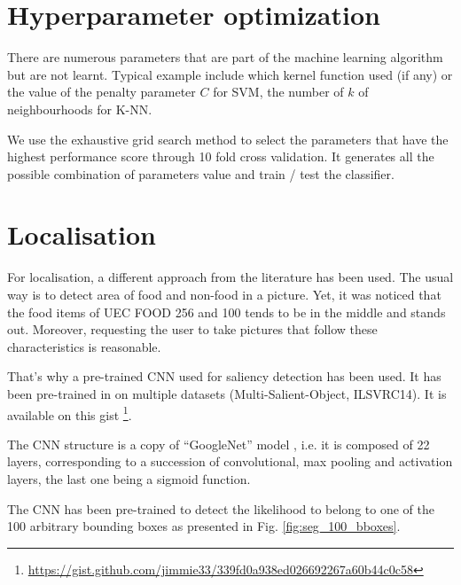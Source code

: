 \section{Hyperparameter optimization}

There are numerous parameters that are part of the machine learning algorithm but are not learnt. Typical example include which kernel function used (if any) or the value of the penalty parameter $C$ for SVM, the number of $k$ of neighbourhoods for K-NN.

We use the exhaustive grid search method to select the parameters that have the highest performance score through 10 fold cross validation. It generates all the possible combination of parameters value and train / test the classifier.

\section{Localisation}

For localisation, a different approach from the literature has been used. The usual way is to detect area of food and non-food in a picture. Yet, it was noticed that the food items of UEC FOOD 256 and 100 tends to be in the middle and stands out. Moreover, requesting the user to take pictures that follow these characteristics is reasonable.

That's why a pre-trained CNN used for saliency detection has been used. It has been pre-trained in \cite{zhang2015SOD} on multiple datasets (Multi-Salient-Object, ILSVRC14). It is available on this gist \footnote{\url{https://gist.github.com/jimmie33/339fd0a938ed026692267a60b44c0c58}}.

The CNN structure is a copy of \enquote{GoogleNet} model \cite{Szegedy2015}, i.e. it is composed of 22 layers, corresponding to a succession of convolutional, max pooling and activation layers, the last one being a sigmoid function.

The CNN has been pre-trained to detect the likelihood to belong to one of the 100 arbitrary bounding boxes as presented in Fig. \ref{fig:seg_100_bboxes}.

